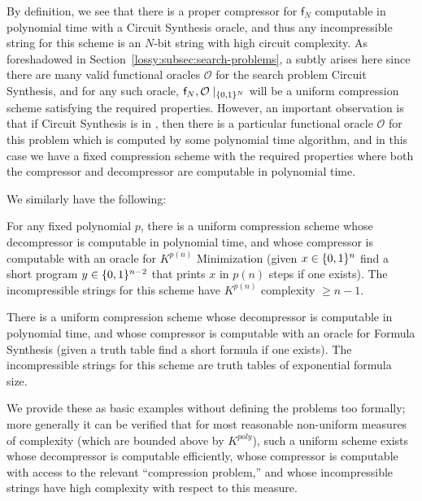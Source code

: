 By definition, we see that there is a proper compressor for $\mathsf{f}_N$ computable in polynomial time with a {\sc Circuit Synthesis} oracle, and thus any incompressible string for this scheme is an $N$-bit string with high circuit complexity. As foreshadowed in Section~\ref{lossy:subsec:search-problems}, a subtly arises here since there are many valid functional oracles $\mathcal{O}$ for the search problem {\sc Circuit Synthesis}, and for any such oracle, $\mathsf{f}_N,\mathcal{O}\mid_{\{0,1\}^N}$ will be a uniform compression scheme satisfying the required properties. However, an important observation is that if {\sc Circuit Synthesis} is in , then there is a particular functional oracle $\mathcal{O}$ for this problem which is computed by some polynomial time algorithm, and in this case we have a fixed compression scheme with the required properties where both the compressor and decompressor are computable in polynomial time.

We similarly have the following:
\begin{lemma}
For any fixed polynomial $p$, there is a uniform compression scheme whose decompressor is computable in polynomial time, and whose compressor is computable with an oracle for {\sc $K^{p(n)}$ Minimization} (given $x \in \{0,1\}^n$ find a short program $y \in \{0,1\}^{n-2}$ that prints $x$ in $p(n)$ steps if one exists). The incompressible strings for this scheme have $K^{p(n)}$ complexity $\geq n-1$.
\end{lemma}
\begin{lemma}
There is a uniform compression scheme whose decompressor is computable in polynomial time, and whose compressor is computable with an oracle for {\sc Formula Synthesis} (given a truth table find a short formula if one exists). The incompressible strings for this scheme are truth tables of exponential formula size.
\end{lemma}
We provide these as basic examples without defining the problems too formally; more generally it can be verified that for most reasonable non-uniform measures of complexity (which are bounded above by $K^{poly}$), such a uniform scheme exists whose decompressor is computable efficiently, whose compressor is computable with access to the relevant ``compression problem,'' and whose incompressible strings have high complexity with respect to this measure.
